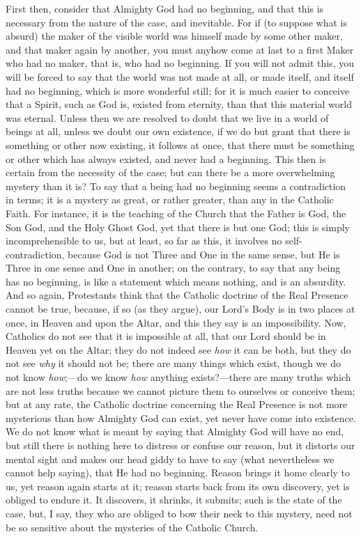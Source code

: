 First then, consider that Almighty God had no beginning, and that
this is necessary from the nature of the case, and inevitable. For if
(to suppose what is absurd) the maker of the visible world was himself
made by some other maker, and that maker again by another, you must
anyhow come at last to a first Maker who had no maker, that is, who
had no beginning. If you will not admit this, you will be forced to
say that the world was not made at all, or made itself, and itself had
no beginning, which is more wonderful still; for it is much easier to
conceive that a Spirit, such as God is, existed from eternity, than
that this material world was eternal. Unless then we are resolved to
doubt that we live in a world of beings at all, unless we doubt our
own existence, if we do but grant that there is something or other now
existing, it follows at once, that there must be something or other
which has always existed, and never had a beginning. This then is
certain from the necessity of the case; but can there be a more
overwhelming mystery than it is? To say that a being had no beginning
seems a contradiction in terms; it is a mystery as great, or rather
greater, than any in the Catholic Faith. For instance, it is the
teaching of the Church that the Father is God, the Son God, and the
Holy Ghost God, yet that there is but one God; this is simply
incomprehensible to us, but at least, so far as this, it involves no
self-contradiction, because God is not Three and One in the same
sense, but He is Three in one sense and One in another; on the
contrary, to say that any being has no beginning, is like a statement
which means nothing, and is an absurdity. And so again, Protestants
think that the Catholic doctrine of the Real Presence cannot be true,
because, if so (as they argue), our Lord's Body is in two places at
once, in Heaven and upon the Altar, and this they say is an
impossibility. Now, Catholics do not see that it is impossible at all,
that our Lord should be in Heaven yet on the Altar; they do not indeed
see \emph{how} it can be both, but they do not see \emph{why} it
should not be; there are many things which exist, though we do not
know \emph{how};—do we know \emph{how} anything exists?—there are
many truths which are not less truths because we cannot picture them
to ourselves or conceive them; but at any rate, the Catholic doctrine
concerning the Real Presence is not more mysterious than how Almighty
God can exist, yet never have come into existence. We do not know what
is meant by saying that Almighty God will have no end, but still there
is nothing here to distress or confuse our reason, but it distorts our
mental sight and makes our head giddy to have to say (what
nevertheless we cannot help saying), that He had no beginning. Reason
brings it home clearly to us, yet reason again starts at it; reason
starts back from its own discovery, yet is obliged to endure it. It
discovers, it shrinks, it submits; such is the state of the case, but,
I say, they who are obliged to bow their neck to this mystery, need
not be so sensitive about the mysteries of the Catholic Church.

